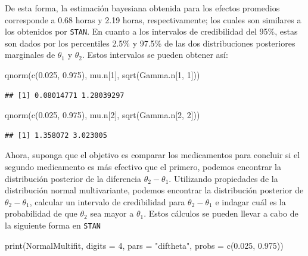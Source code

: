 \documentclass[
  10pt,
  spanish,
]{book}
\newenvironment{Shaded}{\begin{snugshade}}{\end{snugshade}}
\newcommand{\AttributeTok}[1]{\textcolor[rgb]{0.77,0.63,0.00}{#1}}
\newcommand{\DecValTok}[1]{\textcolor[rgb]{0.00,0.00,0.81}{#1}}
\newcommand{\FloatTok}[1]{\textcolor[rgb]{0.00,0.00,0.81}{#1}}
\newcommand{\FunctionTok}[1]{\textcolor[rgb]{0.00,0.00,0.00}{#1}}
\newcommand{\NormalTok}[1]{#1}
\newcommand{\StringTok}[1]{\textcolor[rgb]{0.31,0.60,0.02}{#1}}
\theoremstyle{definition}
\theoremstyle{definition}
\theoremstyle{definition}
\theoremstyle{definition}
\theoremstyle{remark}
\begin{document}
De esta forma, la estimación bayesiana obtenida para los efectos promedios corresponde a 0.68 horas y 2.19 horas, respectivamente; los cuales son similares a los obtenidos por \texttt{STAN}. En cuanto a los intervalos de credibilidad del 95\%, estas son dados por los percentiles 2.5\% y 97.5\% de las dos distribuciones posteriores marginales de \(\theta_1\) y \(\theta_2\). Estos intervalos se pueden obtener así:

\begin{Shaded}
\begin{Highlighting}[]
\FunctionTok{qnorm}\NormalTok{(}\FunctionTok{c}\NormalTok{(}\FloatTok{0.025}\NormalTok{, }\FloatTok{0.975}\NormalTok{), mu.n[}\DecValTok{1}\NormalTok{], }\FunctionTok{sqrt}\NormalTok{(Gamma.n[}\DecValTok{1}\NormalTok{, }\DecValTok{1}\NormalTok{]))}
\end{Highlighting}
\end{Shaded}

\begin{verbatim}
## [1] 0.08014771 1.28039297
\end{verbatim}

\begin{Shaded}
\begin{Highlighting}[]
\FunctionTok{qnorm}\NormalTok{(}\FunctionTok{c}\NormalTok{(}\FloatTok{0.025}\NormalTok{, }\FloatTok{0.975}\NormalTok{), mu.n[}\DecValTok{2}\NormalTok{], }\FunctionTok{sqrt}\NormalTok{(Gamma.n[}\DecValTok{2}\NormalTok{, }\DecValTok{2}\NormalTok{]))}
\end{Highlighting}
\end{Shaded}

\begin{verbatim}
## [1] 1.358072 3.023005
\end{verbatim}

Ahora, suponga que el objetivo es comparar los medicamentos para concluir si el segundo medicamento es más efectivo que el primero, podemos encontrar la distribución posterior de la diferencia \(\theta_2-\theta_1\). Utilizando propiedades de la distribución normal multivariante, podemos encontrar la distribución posterior de \(\theta_2-\theta_1\), calcular un intervalo de credibilidad para \(\theta_2-\theta_1\) e indagar cuál es la probabilidad de que \(\theta_2\) sea mayor a \(\theta_1\). Estos cálculos se pueden llevar a cabo de la siguiente forma en \texttt{STAN}

\begin{Shaded}
\begin{Highlighting}[]
\FunctionTok{print}\NormalTok{(NormalMultifit, }\AttributeTok{digits =} \DecValTok{4}\NormalTok{, }
      \AttributeTok{pars =} \StringTok{"diftheta"}\NormalTok{, }\AttributeTok{probs =} \FunctionTok{c}\NormalTok{(}\FloatTok{0.025}\NormalTok{, }\FloatTok{0.975}\NormalTok{))}
\end{Highlighting}
\end{Shaded}
\end{document}
